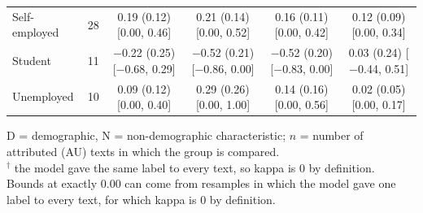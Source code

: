 \begin{table}[t]
\begin{tabular}{@{}lr*{4}{c}@{}}
\quad Self-employed & 28 & \makecell{0.19 (0.12)\\ {[}0.00, 0.46{]}} & \makecell{0.21 (0.14)\\ {[}0.00, 0.52{]}} & \makecell{0.16 (0.11)\\ {[}0.00, 0.42{]}} & \makecell{0.12 (0.09)\\ {[}0.00, 0.34{]}} \\
\quad Student & 11 & \makecell{$-$0.22 (0.25)\\ {[}$-$0.68, 0.29{]}} & \makecell{$-$0.52 (0.21)\\ {[}$-$0.86, 0.00{]}} & \makecell{$-$0.52 (0.20)\\ {[}$-$0.83, 0.00{]}} & \makecell{0.03 (0.24)\\ {[}$-$0.44, 0.51{]}} \\
\quad Unemployed & 10 & \makecell{0.09 (0.12)\\ {[}0.00, 0.40{]}} & \makecell{0.29 (0.26)\\ {[}0.00, 1.00{]}} & \makecell{0.14 (0.16)\\ {[}0.00, 0.56{]}} & \makecell{0.02 (0.05)\\ {[}0.00, 0.17{]}} \\
\bottomrule
\end{tabular}
\par\smallskip
\begin{minipage}{\linewidth}
\footnotesize
D = demographic, N = non-demographic characteristic; $n$ = number of attributed (\ac{AU}) texts in which the group is compared. \\
$^\dagger$ the model gave the same label to every text, so kappa is 0 by definition. \\
Bounds at exactly 0.00 can come from resamples in which the model gave one label to every text, for which kappa is 0 by definition.
\end{minipage}
\end{table}
